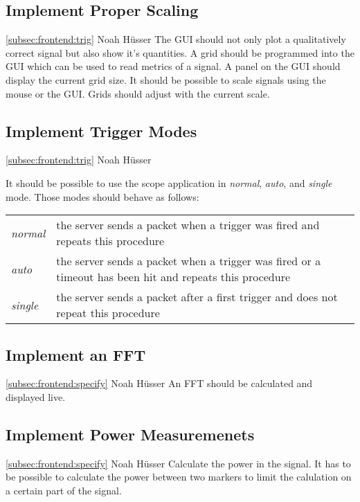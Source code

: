 \documentclass[a4paper,oneside]{alpenspecs/alpenspecs}
\begin{document}
\subsection{Implement Proper Scaling}
\label{subsec:frontend:scaling}
\wpac
    {}
    {}
    {}
    {\ref{subsec:frontend:trig}}
    {}
    {Noah Hüsser}
    {%
        The GUI should not only plot a qualitatively correct signal but also show it's quantities.
        A grid should be programmed into the GUI which can be used to read metrics of a signal. A panel on the GUI should display the current grid size.
        It should be possible to scale signals using the mouse or the GUI. Grids should adjust with the current scale.
    }

\subsection{Implement Trigger Modes}
\label{subsec:frontend:modes}
\wpac
    {}
    {}
    {}
    {\ref{subsec:frontend:trig}}
    {}
    {Noah Hüsser}
    {%
        It should be possible to use the scope application in \textit{normal}, \textit{auto}, and \textit{single} mode. Those modes should behave as follows:
        \begin{tabular}{l l}
        \textit{normal} & the server sends a packet when a trigger was fired and repeats this procedure \\
        \textit{auto} & the server sends a packet when a trigger was fired or a timeout has been hit and repeats this procedure \\
        \textit{single} & the server sends a packet after a first trigger and does not repeat this procedure
        \end{tabular}
    }

\subsection{Implement an FFT}
\label{subsec:frontend:fft}
\wpac
    {}
    {}
    {}
    {\ref{subsec:frontend:specify}}
    {}
    {Noah Hüsser}
    {%
        An FFT should be calculated and displayed live.
    }

\subsection{Implement Power Measuremenets}
\label{subsec:frontend:}
\wpac
    {}
    {}
    {}
    {\ref{subsec:frontend:specify}}
    {}
    {Noah Hüsser}
    {%
        Calculate the power in the signal.
        It has to be possible to calculate the power between two markers to limit the calulation on a certain part of the signal.
    }
\end{document}
